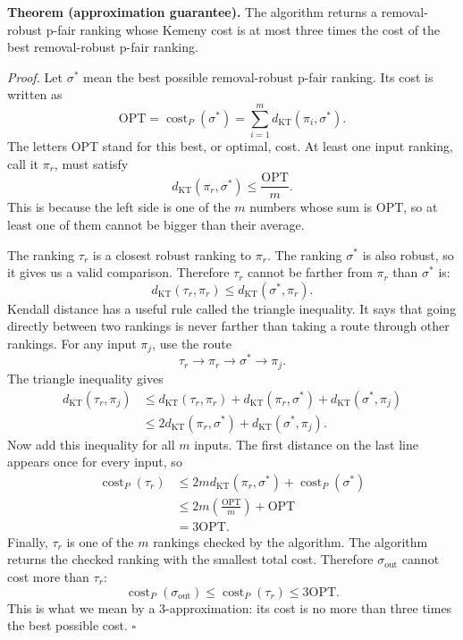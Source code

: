 \documentclass[11pt]{article}
\newcommand{\KT}{d_{\mathrm{KT}}}
\begin{document}
\medskip
\noindent\textbf{Theorem (approximation guarantee).}
The algorithm returns a removal-robust p-fair ranking whose Kemeny cost is at
most three times the cost of the best removal-robust p-fair ranking.
\medskip

\noindent\textit{Proof.}
Let $\sigma^*$ mean the best possible removal-robust p-fair ranking.  Its cost
is written as
\[
 \mathrm{OPT}=\operatorname{cost}_P(\sigma^*)
 =\sum_{i=1}^{m}\KT(\pi_i,\sigma^*).
\]
The letters OPT stand for this best, or optimal, cost.  At least one input
ranking, call it $\pi_r$, must satisfy
\[
 \KT(\pi_r,\sigma^*)\le \frac{\mathrm{OPT}}{m}.
\]
This is because the left side is one of the $m$ numbers whose sum is
$\mathrm{OPT}$, so at least one of them cannot be bigger than their average.

The ranking $\tau_r$ is a closest robust ranking to $\pi_r$.  The ranking
$\sigma^*$ is also robust, so it gives us a valid comparison.  Therefore
$\tau_r$ cannot be farther from $\pi_r$ than $\sigma^*$ is:
\[
 \KT(\tau_r,\pi_r)\le \KT(\sigma^*,\pi_r).
\]
Kendall distance has a useful rule called the triangle inequality.  It says
that going directly between two rankings is never farther than taking a route
through other rankings.  For any input $\pi_j$, use the route
\[
 \tau_r\longrightarrow\pi_r\longrightarrow\sigma^*\longrightarrow\pi_j.
\]
The triangle inequality gives
\begin{align*}
 \KT(\tau_r,\pi_j)
 &\le \KT(\tau_r,\pi_r)
       +\KT(\pi_r,\sigma^*)
       +\KT(\sigma^*,\pi_j)\\
 &\le 2\KT(\pi_r,\sigma^*)+\KT(\sigma^*,\pi_j).
\end{align*}
Now add this inequality for all $m$ inputs.  The first distance on the last
line appears once for every input, so
\begin{align*}
 \operatorname{cost}_P(\tau_r)
 &\le 2m\KT(\pi_r,\sigma^*)+\operatorname{cost}_P(\sigma^*)\\
 &\le 2m\left(\frac{\mathrm{OPT}}m\right)+\mathrm{OPT}\\
 &=3\mathrm{OPT}.
\end{align*}
Finally, $\tau_r$ is one of the $m$ rankings checked by the algorithm.  The
algorithm returns the checked ranking with the smallest total cost.  Therefore
$\sigma_{\mathrm{out}}$ cannot cost more than $\tau_r$:
\[
 \operatorname{cost}_P(\sigma_{\mathrm{out}})
 \le \operatorname{cost}_P(\tau_r)
 \le 3\mathrm{OPT}.
\]
This is what we mean by a 3-approximation: its cost is no more than three
times the best possible cost.
\hfill\(\square\)
\end{document}
